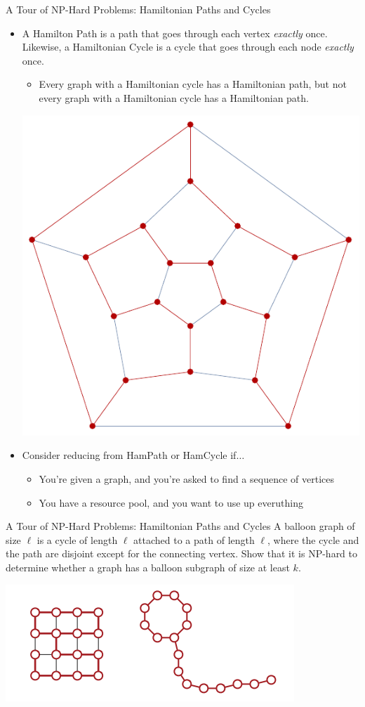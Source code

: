 \documentclass{beamer}
\begin{document}
\begin{frame}[t]{A Tour of NP-Hard Problems: Hamiltonian Paths and Cycles}
    \begin{itemize}
        \item A \alert{Hamilton Path} is a path that goes through each vertex \textit{exactly} once. Likewise, a \alert{Hamiltonian Cycle} is a cycle that goes through each node \textit{exactly} once.
        \begin{itemize}
            \item Every graph with a Hamiltonian cycle has a Hamiltonian path, but not every graph with a Hamiltonian cycle has a Hamiltonian path.
        \end{itemize}
        \begin{center}
            \includegraphics[height=.3\linewidth]{hamcycle.pdf}
        \end{center}
        \item \pause Consider reducing from \alert{HamPath} or \alert{HamCycle} if$\dotsc$
        \begin{itemize}
            \item \pause You're given a graph, and you're asked to find a sequence of vertices
            \item \pause You have a resource pool, and you want to use up everuthing
        \end{itemize}
    \end{itemize}
\end{frame}

\begin{frame}[t]{A Tour of NP-Hard Problems: Hamiltonian Paths and Cycles}
A \alert{balloon graph} of size $\ell$ is a cycle of length $\ell$ attached to a path of length $\ell$, where the cycle and the path are disjoint except for the connecting vertex. Show that it is NP-hard to determine whether a graph has a balloon subgraph of size at least $k$.
\begin{center}
    \includegraphics[width=.4\linewidth]{balloon.PNG}
\end{center}
\end{frame}
\end{document}
